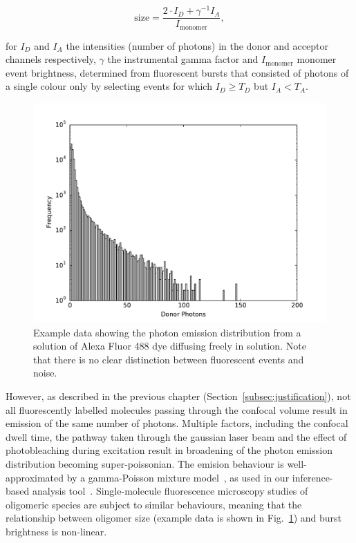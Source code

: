 \begin{equation}
\text{size} = \frac{2\cdot I_D + \gamma^{-1} I_A}{I_{\text{monomer}}},
\label{eq:size_linear}
\end{equation}

for $I_D$ and $I_A$ the intensities (number of photons) in the donor and acceptor channels respectively, $\gamma$ the instrumental gamma factor and $I_{\text{monomer}}$ monomer event brightness, determined from fluorescent bursts that consisted of photons of a single colour only by selecting events for which $I_D \geq T_D$ but $I_A < T_A$.

\begin{figure}
   \begin{center}
      \includegraphics*[clip=true, width=5in]{sizing/data_blue_dye_sample.pdf}
      \caption{Example data showing the photon emission distribution from a solution of Alexa Fluor 488 dye diffusing freely in solution. Note that there is no clear distinction between fluorescent events and noise.}
      \label{fig:example_monomer_emission}
   \end{center}
\end{figure}


However, as described in the previous chapter (Section~\ref{subsec:justification}), not all fluorescently labelled molecules passing through the confocal volume result in emission of the same number of photons. Multiple factors, including the confocal dwell time, the pathway taken through the gaussian laser beam and the effect of photobleaching during excitation result in broadening of the photon emission distribution becoming super-poissonian. The emision behaviour is well-approximated by a gamma-Poisson mixture model~\cite{chen1999}, as used in our inference-based analysis tool~\cite{murphy14}. Single-molecule fluorescence microscopy studies of oligomeric species are subject to similar behaviours, meaning that the relationship between oligomer size (example data is shown in Fig.~\ref{fig:example_monomer_emission}) and burst brightness is non-linear. 

